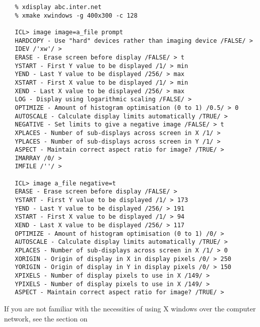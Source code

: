 \begin{verbatim}
   % xdisplay abc.inter.net
   % xmake xwindows -g 400x300 -c 128

   ICL> image image=a_file prompt
   HARDCOPY - Use "hard" devices rather than imaging device /FALSE/ >
   IDEV /'xw'/ >
   ERASE - Erase screen before display /FALSE/ > t
   YSTART - First Y value to be displayed /1/ > min
   YEND - Last Y value to be displayed /256/ > max
   XSTART - First X value to be displayed /1/ > min
   XEND - Last X value to be displayed /256/ > max
   LOG - Display using logarithmic scaling /FALSE/ >
   OPTIMIZE - Amount of histogram optimisation (0 to 1) /0.5/ > 0
   AUTOSCALE - Calculate display limits automatically /TRUE/ >
   NEGATIVE - Set limits to give a negative image /FALSE/ > t
   XPLACES - Number of sub-displays across screen in X /1/ >
   YPLACES - Number of sub-displays across screen in Y /1/ >
   ASPECT - Maintain correct aspect ratio for image? /TRUE/ >
   IMARRAY /0/ >
   IMFILE /''/ >

   ICL> image a_file negative=t
   ERASE - Erase screen before display /FALSE/ >
   YSTART - First Y value to be displayed /1/ > 173
   YEND - Last Y value to be displayed /256/ > 191
   XSTART - First X value to be displayed /1/ > 94
   XEND - Last X value to be displayed /256/ > 117
   OPTIMIZE - Amount of histogram optimisation (0 to 1) /0/ >
   AUTOSCALE - Calculate display limits automatically /TRUE/ >
   XPLACES - Number of sub-displays across screen in X /1/ > 0
   XORIGIN - Origin of display in X in display pixels /0/ > 250
   YORIGIN - Origin of display in Y in display pixels /0/ > 150
   XPIXELS - Number of display pixels to use in X /149/ >
   YPIXELS - Number of display pixels to use in X /149/ >
   ASPECT - Maintain correct aspect ratio for image? /TRUE/ >
\end{verbatim}

\begin{latexonly}
\begin{figure}[htb]
\begin{center}
\leavevmode{}
\end{center}
\end{figure}
\end{latexonly}

   If you are not familiar with the necessities of using X windows over
   the computer network, see
   {the section on }


